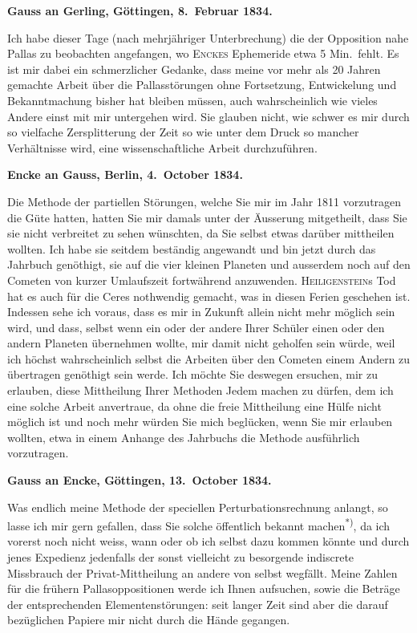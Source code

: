 \documentclass[12pt,a4paper]{article}
\begin{document}
\newpage
\setcounter{page}{442}
%
\medskip\noindent
\textbf{Gauss an Gerling, Göttingen, 8.~Februar 1834.}

Ich habe dieser Tage (nach mehrjähriger Unterbrechung) die der Opposition nahe Pallas zu beobachten angefangen, wo \textsc{Enckes} Ephemeride etwa 5 Min.~fehlt. Es ist mir dabei ein schmerzlicher Gedanke, dass meine vor mehr als 20 Jahren gemachte Arbeit über die Pallasstörungen ohne Fortsetzung, Entwickelung und Bekanntmachung bisher hat bleiben müssen, auch wahrscheinlich wie vieles Andere einst mit mir untergehen wird. Sie glauben nicht, wie schwer es mir durch so vielfache Zersplitterung der Zeit so wie unter dem Druck so mancher Verhältnisse wird, eine wissenschaftliche Arbeit durchzuführen.

\medskip\noindent
\textbf{Encke an Gauss, Berlin, 4.~October 1834.}

{ Die Methode der partiellen Störungen, welche Sie mir im Jahr 1811 vorzutragen die Güte hatten, hatten Sie mir damals unter der Äusserung mitgetheilt, dass Sie sie nicht verbreitet zu sehen wünschten, da Sie selbst etwas darüber mittheilen wollten. Ich habe sie seitdem beständig angewandt und bin jetzt durch das Jahrbuch genöthigt, sie auf die vier kleinen Planeten und ausserdem noch auf den Cometen von kurzer Umlaufszeit fortwährend anzuwenden. \textsc{Heiligenstein}s Tod hat es auch für die Ceres nothwendig gemacht, was in diesen Ferien geschehen ist. Indessen sehe ich voraus, dass es mir in Zukunft allein nicht mehr möglich sein wird, und dass, selbst wenn ein oder der andere Ihrer Schüler einen oder den andern Planeten übernehmen wollte, mir damit nicht geholfen sein würde, weil ich höchst wahrscheinlich selbst die Arbeiten über den Cometen einem Andern zu übertragen genöthigt sein werde. Ich möchte Sie deswegen ersuchen, mir zu erlauben, diese Mittheilung Ihrer Methoden Jedem machen zu dürfen, dem ich eine solche Arbeit anvertraue, da ohne die freie Mittheilung eine Hülfe nicht möglich ist und noch mehr würden Sie mich beglücken, wenn Sie mir erlauben wollten, etwa in einem Anhange des Jahrbuchs die Methode ausführlich vorzutragen. }

\newpage
\setcounter{page}{443}
%
\medskip\noindent
\textbf{Gauss an Encke, Göttingen, 13.~October 1834.}

Was endlich meine Methode der speciellen Perturbationsrechnung anlangt, so lasse ich mir gern gefallen, dass Sie solche öffentlich bekannt machen\textsuperscript{*)}, da ich vorerst noch nicht weiss, wann oder ob ich selbst dazu kommen könnte und durch jenes Expedienz jedenfalls der sonst vielleicht zu besorgende indiscrete Missbrauch der Privat-Mittheilung an andere von selbst wegfällt. Meine Zahlen für die frühern Pallasoppositionen werde ich Ihnen aufsuchen, sowie die Beträge der entsprechenden Elementenstörungen: seit langer Zeit sind aber die darauf bezüglichen Papiere mir nicht durch die Hände gegangen.
\end{document}
